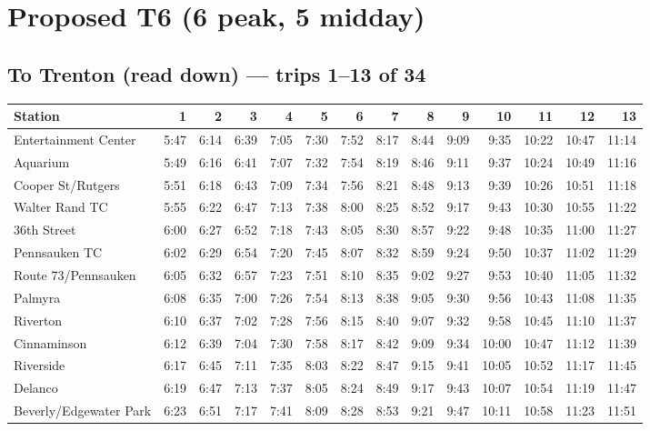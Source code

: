 \section{Proposed T6 (6 peak, 5 midday)}\label{tt:proposed_T6}
\subsection*{To Trenton (read down) --- trips 1--13 of 34}
\begin{center}\footnotesize\setlength{\tabcolsep}{3pt}\begin{tabular}{@{}lrrrrrrrrrrrrr@{}}\toprule
Station & 1 & 2 & 3 & 4 & 5 & 6 & 7 & 8 & 9 & 10 & 11 & 12 & 13 \\\midrule
Entertainment Center & 5:47 & 6:14 & 6:39 & 7:05 & 7:30 & 7:52 & 8:17 & 8:44 & 9:09 & 9:35 & 10:22 & 10:47 & 11:14 \\
Aquarium & 5:49 & 6:16 & 6:41 & 7:07 & 7:32 & 7:54 & 8:19 & 8:46 & 9:11 & 9:37 & 10:24 & 10:49 & 11:16 \\
Cooper St/Rutgers & 5:51 & 6:18 & 6:43 & 7:09 & 7:34 & 7:56 & 8:21 & 8:48 & 9:13 & 9:39 & 10:26 & 10:51 & 11:18 \\
Walter Rand TC & 5:55 & 6:22 & 6:47 & 7:13 & 7:38 & 8:00 & 8:25 & 8:52 & 9:17 & 9:43 & 10:30 & 10:55 & 11:22 \\
36th Street & 6:00 & 6:27 & 6:52 & 7:18 & 7:43 & 8:05 & 8:30 & 8:57 & 9:22 & 9:48 & 10:35 & 11:00 & 11:27 \\
Pennsauken TC & 6:02 & 6:29 & 6:54 & 7:20 & 7:45 & 8:07 & 8:32 & 8:59 & 9:24 & 9:50 & 10:37 & 11:02 & 11:29 \\
Route 73/Pennsauken & 6:05 & 6:32 & 6:57 & 7:23 & 7:51 & 8:10 & 8:35 & 9:02 & 9:27 & 9:53 & 10:40 & 11:05 & 11:32 \\
Palmyra & 6:08 & 6:35 & 7:00 & 7:26 & 7:54 & 8:13 & 8:38 & 9:05 & 9:30 & 9:56 & 10:43 & 11:08 & 11:35 \\
Riverton & 6:10 & 6:37 & 7:02 & 7:28 & 7:56 & 8:15 & 8:40 & 9:07 & 9:32 & 9:58 & 10:45 & 11:10 & 11:37 \\
Cinnaminson & 6:12 & 6:39 & 7:04 & 7:30 & 7:58 & 8:17 & 8:42 & 9:09 & 9:34 & 10:00 & 10:47 & 11:12 & 11:39 \\
Riverside & 6:17 & 6:45 & 7:11 & 7:35 & 8:03 & 8:22 & 8:47 & 9:15 & 9:41 & 10:05 & 10:52 & 11:17 & 11:45 \\
Delanco & 6:19 & 6:47 & 7:13 & 7:37 & 8:05 & 8:24 & 8:49 & 9:17 & 9:43 & 10:07 & 10:54 & 11:19 & 11:47 \\
Beverly/Edgewater Park & 6:23 & 6:51 & 7:17 & 7:41 & 8:09 & 8:28 & 8:53 & 9:21 & 9:47 & 10:11 & 10:58 & 11:23 & 11:51 \\

\end{tabular}
\end{center}

